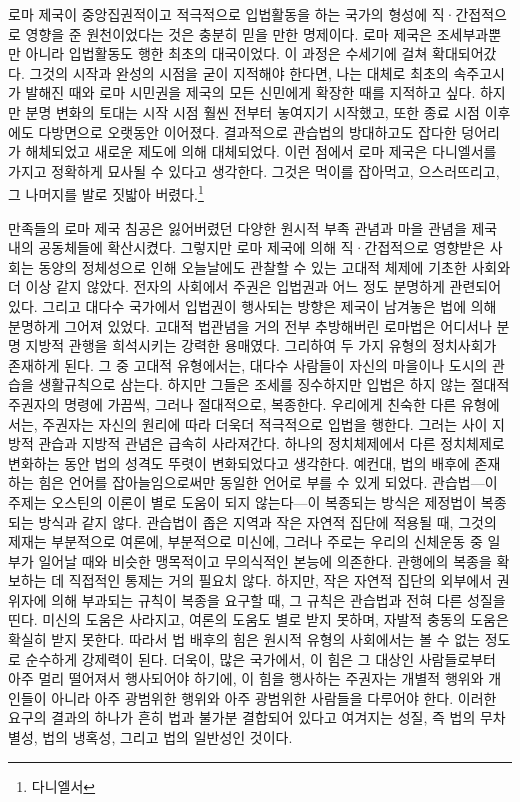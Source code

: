 로마 제국이 중앙집권적이고 적극적으로 입법활동을 하는 국가의 형성에
직·간접적으로 영향을 준 원천이었다는 것은 충분히 믿을 만한 명제이다.
로마 제국은 조세부과뿐만 아니라 입법활동도 행한 최초의 대국이었다.
이 과정은 수세기에 걸쳐 확대되어갔다.
그것의 시작과 완성의 시점을 굳이 지적해야 한다면,
나는 대체로
최초의 속주고시가 발해진 때와
로마 시민권을 제국의 모든 신민에게 확장한 때를 지적하고 싶다.
하지만 분명 변화의 토대는 시작 시점 훨씬 전부터 놓여지기 시작했고,
또한 종료 시점 이후에도 다방면으로 오랫동안 이어졌다.
결과적으로
관습법의 방대하고도 잡다한 덩어리가 해체되었고
새로운 제도에 의해 대체되었다.
이런 점에서 로마 제국은 다니엘서를 가지고 정확하게 묘사될 수 있다고 생각한다.
그것은
먹이를 잡아먹고, 으스러뜨리고, 그 나머지를 발로 짓밟아 버렸다.\footnote{%
  다니엘서  }

만족들의 로마 제국 침공은
잃어버렸던 다양한 원시적 부족 관념과 마을 관념을
제국 내의 공동체들에 확산시켰다.
그렇지만
로마 제국에 의해 직·간접적으로 영향받은 사회는
동양의 정체성으로 인해 오늘날에도 관찰할 수 있는
고대적 체제에 기초한 사회와 더 이상 같지 않았다.
전자의 사회에서 주권은 입법권과 어느 정도 분명하게 관련되어 있다.
그리고
대다수 국가에서 입법권이 행사되는 방향은 제국이 남겨놓은
법에 의해 분명하게 그어져 있었다.
고대적 법관념을 거의 전부 추방해버린 로마법은
어디서나 분명 지방적 관행을 희석시키는 강력한 용매였다.
그리하여 두 가지 유형의 정치사회가 존재하게 된다.
그 중 고대적 유형에서는,
대다수 사람들이 자신의 마을이나 도시의 관습을 생활규칙으로 삼는다.
하지만 그들은 조세를 징수하지만 입법은 하지 않는 절대적 주권자의 명령에
가끔씩, 그러나 절대적으로, 복종한다.
우리에게 친숙한 다른 유형에서는,
주권자는 자신의 원리에 따라 더욱더 적극적으로 입법을 행한다.
그러는 사이 지방적 관습과 지방적 관념은 급속히 사라져간다.
하나의 정치체제에서 다른 정치체제로 변화하는 동안
법의 성격도 뚜렷이 변화되었다고 생각한다.
예컨대, 법의 배후에 존재하는 힘은
언어를 잡아늘임으로써만 동일한 언어로 부를 수 있게 되었다.
관습법---이 주제는 오스틴의 이론이 별로 도움이 되지 않는다---이 복종되는
방식은 제정법이 복종되는 방식과 같지 않다.
관습법이 좁은 지역과 작은 자연적 집단에 적용될 때,
그것의 제재는 부분적으로 여론에, 부분적으로 미신에,
그러나 주로는 우리의 신체운동 중 일부가 일어날 때와 비슷한 맹목적이고
무의식적인 본능에 의존한다.
관행에의 복종을 확보하는 데 직접적인 통제는 거의 필요치 않다.
하지만, 작은 자연적 집단의 외부에서 권위자에 의해 부과되는 규칙이
복종을 요구할 때, 그 규칙은 관습법과 전혀 다른 성질을 띤다.
미신의 도움은 사라지고, 여론의 도움도 별로 받지 못하며,
자발적 충동의 도움은 확실히 받지 못한다.
따라서 법 배후의 힘은 원시적 유형의 사회에서는 볼 수 없는 정도로
순수하게 강제력이 된다.
더욱이, 많은 국가에서,
이 힘은 그 대상인 사람들로부터 아주 멀리 떨어져서 행사되어야 하기에,
이 힘을 행사하는 주권자는
개별적 행위와 개인들이 아니라
아주 광범위한 행위와 아주 광범위한 사람들을 다루어야 한다.
이러한 요구의 결과의 하나가
흔히 법과 불가분 결합되어 있다고 여겨지는 성질,
즉 법의 무차별성, 법의 냉혹성, 그리고 법의 일반성인 것이다.

